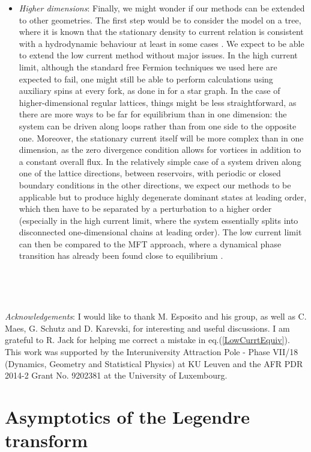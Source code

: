 \documentclass[aps,pre,onecolumn,showpacs,showkeys,a4paper]{revtex4-1}
\begin{document}
\begin{itemize}
\item \textit{Higher dimensions}: Finally, we might wonder if our methods can be extended to other geometries. The first step would be to consider the model on a tree, where it is known that the stationary density to current relation is consistent with a hydrodynamic behaviour at least in some cases \cite{Mottishaw2013}. We expect to be able to extend the low current method without major issues. In the high current limit, although the standard free Fermion techniques we used here are expected to fail, one might still be able to perform calculations using auxiliary spins at every fork, as done in \cite{Crampe2013} for a star graph. In the case of higher-dimensional regular lattices, things might be less straightforward, as there are more ways to be far for equilibrium than in one dimension: the system can be driven along loops rather than from one side to the opposite one. Moreover, the stationary current itself will be more complex than in one dimension, as the zero divergence condition allows for vortices in addition to a constant overall flux. In the relatively simple case of a system driven along one of the lattice directions, between reservoirs, with periodic or closed boundary conditions in the other directions, we expect our methods to be applicable but to produce highly degenerate dominant states at leading order, which then have to be separated by a perturbation to a higher order (especially in the high current limit, where the system essentially splits into disconnected one-dimensional chains at leading order). The low current limit can then be compared to the MFT approach, where a dynamical phase transition has already been found close to equilibrium \cite{Hurtado2011}.
\end{itemize}

~~

~~




\textit{Acknowledgements}: I would like to thank M. Esposito and his group, as well as C. Maes, G. Schutz and D. Karevski, for interesting and useful discussions. I am grateful to R. Jack for helping me correct a mistake in eq.(\ref{LowCurrtEquiv}). This work was supported by the Interuniversity Attraction Pole - Phase VII/18 (Dynamics, Geometry
and Statistical Physics) at KU Leuven and the AFR PDR 2014-2 Grant No. 9202381 at the University of Luxembourg.

\newpage


\appendix

\section{Asymptotics of the Legendre transform}
\label{A1}
\end{document}
